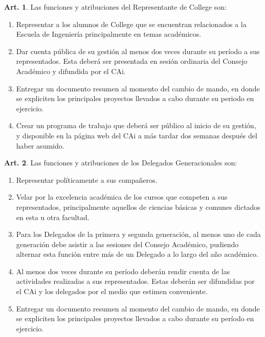 \documentclass[letterpaper,11pt]{article}
\theoremstyle{definition}%
\newtheorem{art}{Art.} %
\begin{document}
\begin{art}\label{representanteCollege}
	Las funciones y atribuciones del Representante de College son:
	\begin{enumerate}
		\item Representar a los alumnos de College que se encuentran relacionados a la Escuela de Ingeniería principalmente en temas académicos.
		\item Dar cuenta pública de su gestión al menos dos veces durante su período a sus representados. Esta deberá ser presentada en sesión ordinaria del Consejo Académico y difundida por el CAi.
		\item Entregar un documento resumen al momento del cambio de mando, en donde se expliciten los principales proyectos llevados a cabo durante su periodo en ejercicio.
		\item Crear un programa de trabajo que deberá ser público al inicio de su gestión, y disponible en la página web del CAi a más tardar dos semanas después del haber asumido.
	\end{enumerate}
\end{art}

\begin{art}\label{funcionesDelegadosGeneracionales}
	Las funciones y atribuciones de los Delegados Generacionales son:
	\begin{enumerate}
		\item Representar políticamente a sus compañeros.
		\item Velar por la excelencia académica de los cursos que competen a sus representados, principalmente aquellos de ciencias básicas y comunes dictados en esta u otra facultad.
		\item Para los Delegados de la primera y segunda generación, al menos uno de cada generación debe asistir a las sesiones del Consejo Académico, pudiendo alternar esta función entre más de un Delegado a lo largo del año académico.
		\item \label{cuentaPublica} Al menos dos veces durante su período deberán rendir cuenta de las actividades realizadas a sus representados. Estas deberán ser difundidas por el CAi y los delegados por el medio que estimen conveniente.
		\item Entregar un documento resumen al momento del cambio de mando, en donde se expliciten los principales proyectos llevados a cabo durante su período en ejercicio.
	\end{enumerate}
\end{art}
\end{document}
